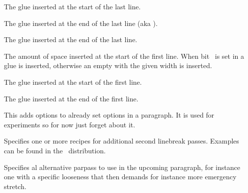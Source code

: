 The glue inserted at the start of the last line.

\stopnewprimitive

\startnewprimitive[title={\prm {parfillrightskip}}]

The glue inserted at the end of the last line (aka ).

\stopnewprimitive

\startoldprimitive[title={\prm {parfillskip}}]

The glue inserted at the end of the last line.

\stopoldprimitive

\startoldprimitive[title={\prm {parindent}}]

The amount of space inserted at the start of the first line. When bit \tobit
{}\ is set in  a glue is
inserted, otherwise an empty  with the given width is inserted.

\stopoldprimitive

\startnewprimitive[title={\prm {parinitleftskip}}]

The glue inserted at the start of the first line.

\stopnewprimitive

\startnewprimitive[title={\prm {parinitrightskip}}]

The glue inserted at the end of the first line.

\stopnewprimitive

\startnewprimitive[title={\prm {paroptions}}]

This adds options to already set options in a paragraph. It is used for
experiments so for now just forget about it.

\stopnewprimitive

\startnewprimitive[title={\prm {parpasses}}]

Specifies one or more recipes for additional second linebreak passes. Examples
can be found in the \CONTEXT\ distribution.

\stopnewprimitive

\startnewprimitive[title={\prm {parpassesexception}}]

Specifies al alternative parpass to use in the upcoming paragraph, for instance
one with a specific looseness that then demands for instance more emergency
stretch.

\stopnewprimitive

\startoldprimitive[title={\prm {parshape}}]

